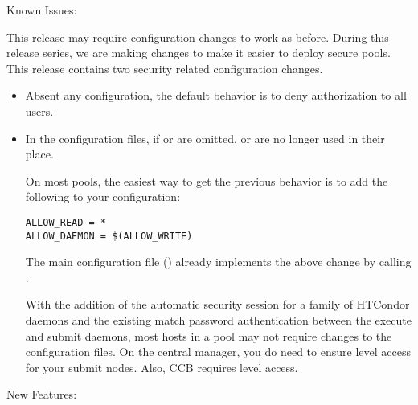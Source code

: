 \noindent Known Issues:

This release may require configuration changes to work as before.
During this release series, we are making changes to make it easier to deploy
secure pools. This release contains two security related configuration changes.

\begin{itemize}

\item Absent any configuration, the default behavior is to deny authorization
to all users.

\item In the configuration files, if  or
 are omitted,  or
 are no longer used in their place.

On most pools, the easiest way to get the previous behavior is to add the
following to your configuration:

\begin{verbatim}
ALLOW_READ = *
ALLOW_DAEMON = $(ALLOW_WRITE)
\end{verbatim}

The main configuration file () already
implements the above change by calling .

With the addition of the automatic security session for a family of HTCondor
daemons and the existing match password authentication between the execute
and submit daemons, most hosts in a pool may not require changes to the
configuration files.
On the central manager, you do need to ensure  level access
for your submit nodes.
Also, CCB requires  level access.

\end{itemize}

\noindent New Features:

